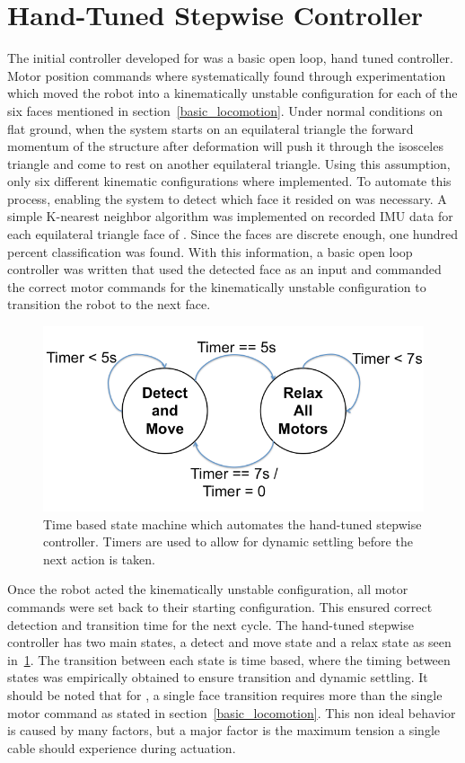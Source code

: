 \section{Hand-Tuned Stepwise Controller}
\label{hand_stepwise}
The initial controller developed for \SB{} was a basic open loop, hand tuned controller.
Motor position commands where systematically found through experimentation which moved the robot into a kinematically unstable configuration for each of the six faces mentioned in section~\ref{basic_locomotion}.
Under normal conditions on flat ground, when the system starts on an equilateral triangle the forward momentum of the structure after deformation will push it through the isosceles triangle and come to rest on another equilateral triangle.
Using this assumption, only six different kinematic configurations where implemented.
To automate this process, enabling the system to detect which face it resided on was necessary.
A simple K-nearest neighbor algorithm was implemented on recorded IMU data for each equilateral triangle face of \SB{}.
Since the faces are discrete enough, one hundred percent classification was found.
With this information, a basic open loop controller was written that used the detected face as an input and commanded the correct motor commands for the kinematically unstable configuration to transition the robot to the next face.

\begin{figure}[thpb]
      \centering
      \includegraphics[width=0.7\columnwidth]{tex/img/Stepwise_state_machine/Slide1_fixed}
      \caption{Time based state machine which automates the hand-tuned stepwise controller. Timers are used to allow for dynamic settling before the next action is taken.}
      \label{fig:stepwise_fsm}
\end{figure}

Once the robot acted the kinematically unstable configuration, all motor commands were set back to their starting configuration.
This ensured correct detection and transition time for the next cycle.
The hand-tuned stepwise controller has two main states, a detect and move state and a relax state as seen in~\ref{fig:stepwise_fsm}.
The transition between each state is time based, where the timing between states was empirically obtained to ensure transition and dynamic settling.
It should be noted that for \SB{}, a single face transition requires more than the single motor command as stated in section~\ref{basic_locomotion}.
This non ideal behavior is caused by many factors, but a major factor is the maximum tension a single cable should experience during actuation.

